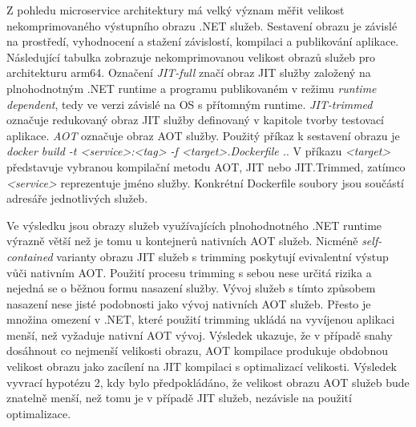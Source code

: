 Z pohledu microservice architektury má velký význam měřit velikost nekomprimovaného výstupního obrazu .NET služeb. Sestavení obrazu je závislé na prostředí, vyhodnocení a stažení závislostí, kompilaci a publikování aplikace. Následující tabulka zobrazuje nekomprimovanou velikost obrazů služeb pro architekturu arm64. Označení \emph{JIT-full} značí obraz JIT služby založený na plnohodnotným .NET runtime a programu publikovaném v režimu \emph{runtime dependent}, tedy ve verzi závislé na OS s přítomným runtime. \emph{JIT-trimmed} označuje redukovaný obraz JIT služby definovaný v kapitole tvorby testovací aplikace. \emph{AOT} označuje obraz AOT služby. Použitý příkaz k sestavení obrazu je \emph{docker build -t <service>:<tag> -f <target>.Dockerfile .}. V příkazu \emph{<target>} představuje vybranou kompilační metodu AOT, JIT nebo JIT.Trimmed, zatímco \emph{<service>} reprezentuje jméno služby. Konkrétní Dockerfile soubory jsou součástí adresáře jednotlivých služeb.


Ve výsledku jsou obrazy služeb využívajících plnohodnotného .NET runtime výrazně větší než je tomu u kontejnerů nativních AOT služeb. Nicméně \emph{self-contained} varianty obrazu JIT služeb s trimming poskytují evivalentní výstup vůči nativním AOT. Použití procesu trimming s sebou nese určitá rizika a nejedná se o běžnou formu nasazení služby. Vývoj služeb s tímto způsobem nasazení nese jisté podobnosti jako vývoj nativních AOT služeb. Přesto je množina omezení v .NET, které použití trimming ukládá na vyvíjenou aplikaci menší, než vyžaduje nativní AOT vývoj. Výsledek ukazuje, že v případě snahy dosáhnout co nejmenší velikosti obrazu, AOT kompilace produkuje obdobnou velikost obrazu jako zacílení na JIT kompilaci s optimalizací velikosti. Výsledek vyvrací hypotézu 2, kdy bylo předpokládáno, že velikost obrazu AOT služeb bude znatelně menší, než tomu je v případě JIT služeb, nezávisle na použití optimalizace.

